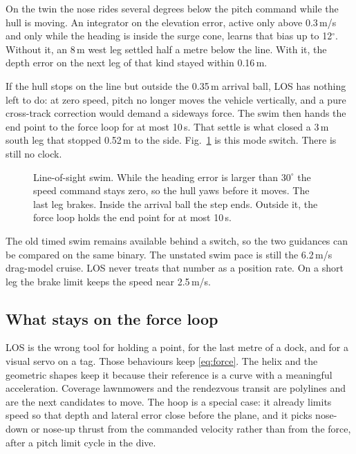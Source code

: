 \documentclass[conference]{IEEEtran}
\begin{document}
On the twin the nose rides several degrees below the pitch command while the hull is moving. An integrator on the elevation error, active only above 0.3\,m/s and only while the heading is inside the surge cone, learns that bias up to 12$^\circ$. Without it, an 8\,m west leg settled half a metre below the line. With it, the depth error on the next leg of that kind stayed within 0.16\,m.

If the hull stops on the line but outside the 0.35\,m arrival ball, LOS has nothing left to do: at zero speed, pitch no longer moves the vehicle vertically, and a pure cross-track correction would demand a sideways force. The swim then hands the end point to the force loop for at most 10\,s. That settle is what closed a 3\,m south leg that stopped 0.52\,m to the side. Fig.~\ref{fig:swim} is this mode switch. There is still no clock.

\begin{figure}[t]
\centering
{}
\caption{Line-of-sight swim. While the heading error is larger than $30^\circ$ the speed command stays zero, so the hull yaws before it moves. The last leg brakes. Inside the arrival ball the step ends. Outside it, the force loop holds the end point for at most 10\,s.}
\label{fig:swim}
\end{figure}

The old timed swim remains available behind a switch, so the two guidances can be compared on the same binary. The unstated swim pace is still the 6.2\,m/s drag-model cruise. LOS never treats that number as a position rate. On a short leg the brake limit keeps the speed near 2.5\,m/s.

\subsection{What stays on the force loop}
LOS is the wrong tool for holding a point, for the last metre of a dock, and for a visual servo on a tag. Those behaviours keep \eqref{eq:force}. The helix and the geometric shapes keep it because their reference is a curve with a meaningful acceleration. Coverage lawnmowers and the rendezvous transit are polylines and are the next candidates to move. The hoop is a special case: it already limits speed so that depth and lateral error close before the plane, and it picks nose-down or nose-up thrust from the commanded velocity rather than from the force, after a pitch limit cycle in the dive.
\end{document}
